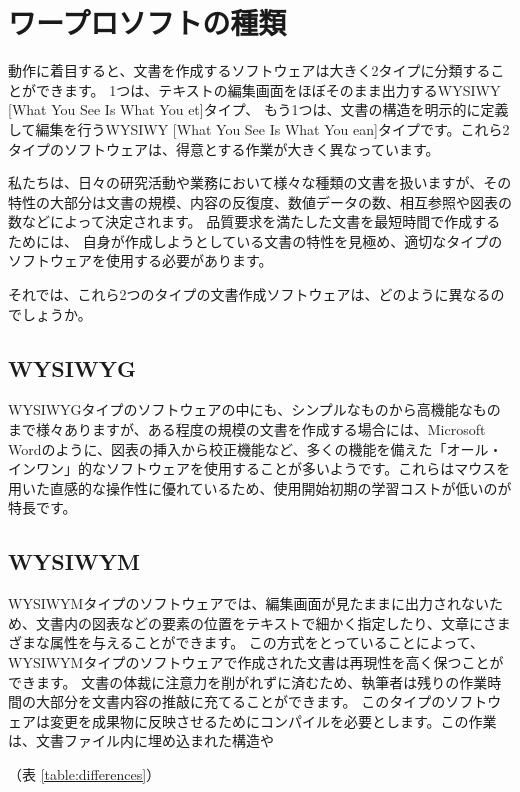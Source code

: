 \documentclass[TeXworkshop]{subfiles}
\begin{document}
\clearpage

\section{ワープロソフトの種類}
動作に着目すると、文書を作成するソフトウェアは大きく2タイプに分類することができます。
1つは、テキストの編集画面をほぼそのまま出力するWYSIWY [What You See Is What You et]タイプ、
もう1つは、文書の構造を明示的に定義して編集を行うWYSIWY [What You See Is What You ean]タイプです。これら2タイプのソフトウェアは、得意とする作業が大きく異なっています。


私たちは、日々の研究活動や業務において様々な種類の文書を扱いますが、その特性の大部分は文書の規模、内容の反復度、数値データの数、相互参照や図表の数などによって決定されます。
品質要求を満たした文書を最短時間で作成するためには、
自身が作成しようとしている文書の特性を見極め、適切なタイプのソフトウェアを使用する必要があります。

それでは、これら2つのタイプの文書作成ソフトウェアは、どのように異なるのでしょうか。

\subsection{WYSIWYG}
WYSIWYGタイプのソフトウェアの中にも、シンプルなものから高機能なものまで様々ありますが、ある程度の規模の文書を作成する場合には、Microsoft Wordのように、図表の挿入から校正機能など、多くの機能を備えた「オール・インワン」的なソフトウェアを使用することが多いようです。これらはマウスを用いた直感的な操作性に優れているため、使用開始初期の学習コストが低いのが特長です。

\subsection{WYSIWYM}
WYSIWYMタイプのソフトウェアでは、編集画面が見たままに出力されないため、文書内の図表などの要素の位置をテキストで細かく指定したり、文章にさまざまな属性を与えることができます。
この方式をとっていることによって、WYSIWYMタイプのソフトウェアで作成された文書は再現性を高く保つことができます。
文書の体裁に注意力を削がれずに済むため、執筆者は残りの作業時間の大部分を文書内容の推敲に充てることができます。
このタイプのソフトウェアは変更を成果物に反映させるためにコンパイルを必要とします。この作業は、文書ファイル内に埋め込まれた構造や

（表 \ref{table:differences}）
\end{document}
